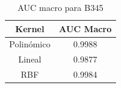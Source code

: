 \begin{table}[H]
	\centering
	\captionsetup{justification=centering}
	\begin{tabular}{|c|c|}
		\hline
		Kernel & AUC Macro \\ \hline \hline
		Polinómico & 0.9988 \\ \hline
		Lineal & 0.9877 \\ \hline
		RBF & 0.9984 \\ \hline
	\end{tabular}
	\caption{AUC macro para B345}
	\label{res:svc_auc_macro_b345}	
\end{table}



